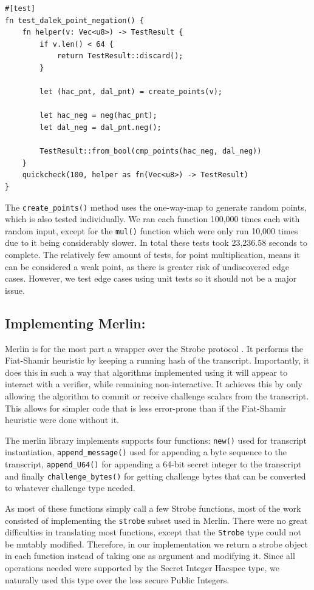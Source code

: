 \documentclass{article}
\begin{document}
\begin{lstlisting}
#[test]
fn test_dalek_point_negation() {
	fn helper(v: Vec<u8>) -> TestResult {
		if v.len() < 64 {
			return TestResult::discard();
		}

		let (hac_pnt, dal_pnt) = create_points(v);

		let hac_neg = neg(hac_pnt);
		let dal_neg = dal_pnt.neg();

		TestResult::from_bool(cmp_points(hac_neg, dal_neg))
	}
	quickcheck(100, helper as fn(Vec<u8>) -> TestResult)
}
\end{lstlisting}

The \texttt{create\_points()} method uses the one-way-map to generate
random points, which is also tested individually. We ran each function
100,000 times each with random input, except for the \texttt{mul()}
function which were only run 10,000 times due to it being considerably
slower. In total these tests took 23,236.58 seconds to complete. The
relatively few amount of tests, for point multiplication, means it can
be considered a weak point, as there is greater risk of undiscovered
edge cases. However, we test edge cases using unit tests so it should
not be a major issue.

\subsection{Implementing Merlin:} \label{implementing-merlin}

Merlin \cite{merlin} is for the most part a wrapper over the Strobe
protocol \cite{strobe}. It performs the Fiat-Shamir heuristic by keeping
a running hash of the transcript. Importantly, it does this in such a
way that algorithms implemented using it will appear to interact with
a verifier, while remaining non-interactive. It achieves this by only
allowing the algorithm to commit or receive challenge scalars from the
transcript. This allows for simpler code that is less error-prone than
if the Fiat-Shamir heuristic were done without it.

The merlin library implements supports four functions: \texttt{new()}
used for transcript instantiation, \texttt{append\_message()} used for
appending a byte sequence to the transcript, \texttt{append\_U64()}
for appending a 64-bit secret integer to the transcript and finally
\texttt{challenge\_bytes()} for getting challenge bytes that can be
converted to whatever challenge type needed.

As most of these functions simply call a few Strobe functions, most
of the work consisted of implementing the \texttt{strobe} subset
used in Merlin. There were no great difficulties in translating most
functions, except that the \texttt{Strobe} type could not be mutably
modified. Therefore, in our implementation we return a strobe object in
each function instead of taking one as argument and modifying it. Since
all operations needed were supported by the Secret Integer Hacspec type,
we naturally used this type over the less secure Public Integers.
\end{document}
